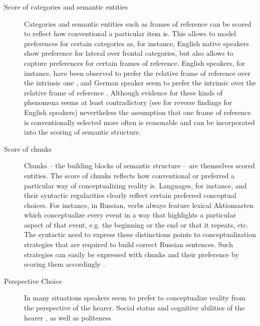 \begin{description}
\item[Score of categories and semantic entities]
Categories and semantic entities such as frames of reference can be 
scored to reflect how 
conventional a particular item is. This allows to model preferences for
certain categories as, for instance, English native speakers show
preference for lateral over frontal categories, but also allows to 
capture \citep{tversky1999speakers} preferences for certain 
frames of reference. English speakers, for instance, 
have been observed to prefer the relative frame of reference
over the intrinsic one \citep{levinson2003space},
and German speaker seem to prefer the intrinsic over the relative frame of reference 
\citep{ehrich1985linguistik}. Although evidence for these kinds of phenomena
seems at least contradictory (see \citealt{miller1976language} for 
reverse findings for English speakers) nevertheless the assumption
that one frame of reference is conventionally selected more often 
is reasonable and can be incorporated into the 
scoring of semantic structure.
\item[Score of chunks]
Chunks -- the building blocks of semantic structure -- are themselves scored entities.
The score of chunks reflects how conventional or preferred a 
particular way of conceptualizing reality is. Languages, for instance, and their
syntactic regularities clearly reflect certain preferred conceptual choices. For instance,
in Russian, verbs always feature lexical Aktionsarten which conceptualize every event
in a way that highlights a particular aspect of that event, e.g. the beginning or the end or
that it repeats, etc. The syntactic need to express
these distinctions points to conceptualization strategies that are required to
build correct Russian sentences. Such strategies can easily be expressed with chunks
and their preference by scoring them accordingly \citep{gerasymova2010acquisition}.
\item[Perspective Choice]
In many situations speakers seem to prefer to conceptualize
reality from the perspective of the hearer. Social status and
cognitive abilities of the hearer \citep{mainwaring2003descriptions}, 
as well as politeness \citep{schober1993spatial} 

\end{description}
